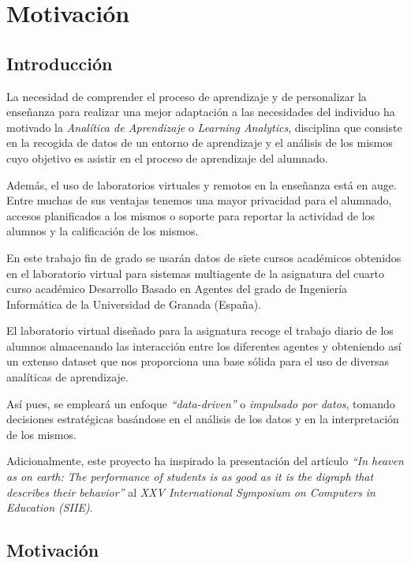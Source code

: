 \chapter*{Motivación}\label{sec:motivation}

\section{Introducción}

La necesidad de comprender el proceso de aprendizaje y de personalizar la enseñanza para realizar una mejor adaptación a las necesidades del individuo ha motivado la \emph{Analítica de Aprendizaje} o \emph{Learning Analytics}, disciplina que consiste en la recogida de datos de un entorno de aprendizaje y el análisis de los mismos cuyo objetivo es asistir en el proceso de aprendizaje del alumnado.

Además, el uso de laboratorios virtuales y remotos en la enseñanza está en auge. Entre muchas de sus ventajas tenemos una mayor privacidad para el alumnado, accesos planificados a los mismos o soporte para reportar la actividad de los alumnos y la calificación de los mismos.

En este trabajo fin de grado se usarán datos de siete cursos académicos obtenidos en el laboratorio virtual para sistemas multiagente de la asignatura del cuarto curso académico Desarrollo Basado en Agentes del grado de Ingeniería Informática de la Universidad de Granada (España).

El laboratorio virtual diseñado para la asignatura recoge el trabajo diario de los alumnos almacenando las interacción entre los diferentes agentes y obteniendo así un extenso dataset que nos proporciona una base sólida para el uso de diversas analíticas de aprendizaje.

Así pues, se empleará un enfoque \emph{``data-driven''} o \emph{impulsado por datos}, tomando decisiones estratégicas basándose en el análisis de los datos y en la interpretación de los mismos.

Adicionalmente, este proyecto ha inspirado la presentación del artículo \emph{``In heaven as on earth: The performance of students is as good as it is the digraph that describes their behavior''} \cite{SIIE23} al \emph{XXV International Symposium on Computers in Education (SIIE)}.

\section{Motivación}

